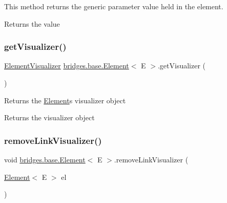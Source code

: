 This method returns the generic parameter value held in the element.

\begin{DoxyReturn}{Returns}
the value 
\end{DoxyReturn}
\mbox{\label{classbridges_1_1base_1_1_element_a42c84d41dfb7bd05a586e303cb33de72}} 
\subsubsection{\texorpdfstring{getVisualizer()}{getVisualizer()}}
{\footnotesize\ttfamily \mbox{\hyperlink{classbridges_1_1base_1_1_element_visualizer}{Element\+Visualizer}} \mbox{\hyperlink{classbridges_1_1base_1_1_element}{bridges.\+base.\+Element}}$<$ E $>$.get\+Visualizer (\begin{DoxyParamCaption}{ }\end{DoxyParamCaption})}

Returns the \mbox{\hyperlink{classbridges_1_1base_1_1_element}{Element}}\textquotesingle{}s visualizer object

\begin{DoxyReturn}{Returns}
the visualizer object 
\end{DoxyReturn}
\mbox{\label{classbridges_1_1base_1_1_element_a144cd54e043a801fab326769a5da01e2}} 
\subsubsection{\texorpdfstring{removeLinkVisualizer()}{removeLinkVisualizer()}}
{\footnotesize\ttfamily void \mbox{\hyperlink{classbridges_1_1base_1_1_element}{bridges.\+base.\+Element}}$<$ E $>$.remove\+Link\+Visualizer (\begin{DoxyParamCaption}\item[{\mbox{\hyperlink{classbridges_1_1base_1_1_element}{Element}}$<$ E $>$}]{el }\end{DoxyParamCaption})\hspace{0.3cm}{\ttfamily [protected]}}


